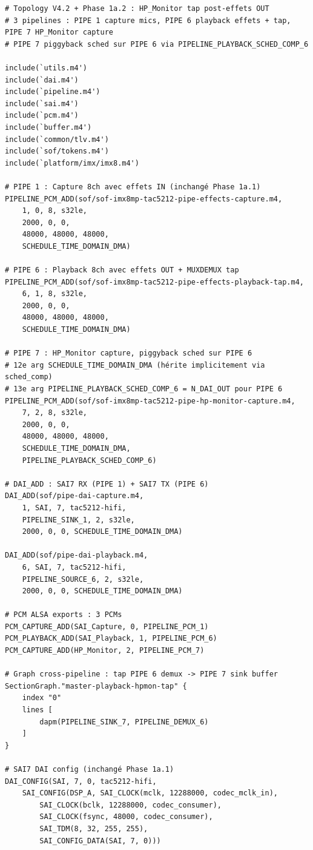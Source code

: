 \documentclass[11pt,a4paper]{article}
\begin{document}
\begin{lstlisting}[language={}, basicstyle=\ttfamily\scriptsize]
# Topology V4.2 + Phase 1a.2 : HP_Monitor tap post-effets OUT
# 3 pipelines : PIPE 1 capture mics, PIPE 6 playback effets + tap, PIPE 7 HP_Monitor capture
# PIPE 7 piggyback sched sur PIPE 6 via PIPELINE_PLAYBACK_SCHED_COMP_6

include(`utils.m4')
include(`dai.m4')
include(`pipeline.m4')
include(`sai.m4')
include(`pcm.m4')
include(`buffer.m4')
include(`common/tlv.m4')
include(`sof/tokens.m4')
include(`platform/imx/imx8.m4')

# PIPE 1 : Capture 8ch avec effets IN (inchangé Phase 1a.1)
PIPELINE_PCM_ADD(sof/sof-imx8mp-tac5212-pipe-effects-capture.m4,
	1, 0, 8, s32le,
	2000, 0, 0,
	48000, 48000, 48000,
	SCHEDULE_TIME_DOMAIN_DMA)

# PIPE 6 : Playback 8ch avec effets OUT + MUXDEMUX tap
PIPELINE_PCM_ADD(sof/sof-imx8mp-tac5212-pipe-effects-playback-tap.m4,
	6, 1, 8, s32le,
	2000, 0, 0,
	48000, 48000, 48000,
	SCHEDULE_TIME_DOMAIN_DMA)

# PIPE 7 : HP_Monitor capture, piggyback sched sur PIPE 6
# 12e arg SCHEDULE_TIME_DOMAIN_DMA (hérite implicitement via sched_comp)
# 13e arg PIPELINE_PLAYBACK_SCHED_COMP_6 = N_DAI_OUT pour PIPE 6
PIPELINE_PCM_ADD(sof/sof-imx8mp-tac5212-pipe-hp-monitor-capture.m4,
	7, 2, 8, s32le,
	2000, 0, 0,
	48000, 48000, 48000,
	SCHEDULE_TIME_DOMAIN_DMA,
	PIPELINE_PLAYBACK_SCHED_COMP_6)

# DAI_ADD : SAI7 RX (PIPE 1) + SAI7 TX (PIPE 6)
DAI_ADD(sof/pipe-dai-capture.m4,
	1, SAI, 7, tac5212-hifi,
	PIPELINE_SINK_1, 2, s32le,
	2000, 0, 0, SCHEDULE_TIME_DOMAIN_DMA)

DAI_ADD(sof/pipe-dai-playback.m4,
	6, SAI, 7, tac5212-hifi,
	PIPELINE_SOURCE_6, 2, s32le,
	2000, 0, 0, SCHEDULE_TIME_DOMAIN_DMA)

# PCM ALSA exports : 3 PCMs
PCM_CAPTURE_ADD(SAI_Capture, 0, PIPELINE_PCM_1)
PCM_PLAYBACK_ADD(SAI_Playback, 1, PIPELINE_PCM_6)
PCM_CAPTURE_ADD(HP_Monitor, 2, PIPELINE_PCM_7)

# Graph cross-pipeline : tap PIPE 6 demux -> PIPE 7 sink buffer
SectionGraph."master-playback-hpmon-tap" {
	index "0"
	lines [
		dapm(PIPELINE_SINK_7, PIPELINE_DEMUX_6)
	]
}

# SAI7 DAI config (inchangé Phase 1a.1)
DAI_CONFIG(SAI, 7, 0, tac5212-hifi,
	SAI_CONFIG(DSP_A, SAI_CLOCK(mclk, 12288000, codec_mclk_in),
		SAI_CLOCK(bclk, 12288000, codec_consumer),
		SAI_CLOCK(fsync, 48000, codec_consumer),
		SAI_TDM(8, 32, 255, 255),
		SAI_CONFIG_DATA(SAI, 7, 0)))
\end{lstlisting}
\end{document}
